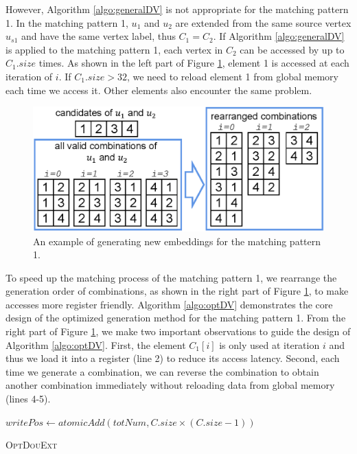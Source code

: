 However, Algorithm \ref{algo:generalDV} is not appropriate for the matching pattern 1. In the matching pattern 1, $u_1$ and $u_2$ are extended from the same source vertex $u_{s1}$ and have the same vertex label, thus $C_1 = C_2$. If Algorithm \ref{algo:generalDV} is applied to the matching pattern 1, each vertex in $C_2$ can be accessed by up to $C_1.size$ times. As shown in the left part of Figure \ref{fig:ep1opt}, element 1 is accessed at each iteration of $i$. If $C_1.size>32$, we need to reload element 1 from global memory each time we access it. Other elements also encounter the same problem.

\begin{figure}
\centering
\includegraphics[width=\columnwidth]{./figure/ep1opt.eps}
\caption{An example of generating new embeddings for the matching pattern 1.}	
\label{fig:ep1opt}
\end{figure}

To speed up the matching process of the matching pattern 1, we rearrange the generation order of combinations, as shown in the right part of Figure \ref{fig:ep1opt}, to make accesses more register friendly. Algorithm \ref{algo:optDV} demonstrates the core design of the optimized generation method for the matching pattern 1. From the right part of Figure \ref{fig:ep1opt}, we make two important observations to guide the design of Algorithm \ref{algo:optDV}. First, the element $C_1[i]$ is only used at iteration $i$ and thus we load it into a register (line 2) to reduce its access latency. Second, each time we generate a combination, we can reverse the combination to obtain another combination immediately without reloading data from global memory (lines 4-5).

\begin{algorithm}
	$writePos \leftarrow atomicAdd(totNum,C.size \times (C.size-1))$\;
	\caption{\textsc{OptDouExt}}
	\label{algo:optDV}
\end{algorithm}

